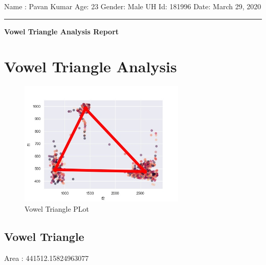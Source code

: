 \documentclass{article}%
\begin{document}
%
\normalsize%
\begin{minipage}{\textwidth}%
\flushleft%
Name : Pavan Kumar%
\newline%
Age: 23%
\newline%
Gender: Male%
\newline%
UH Id: 181996%
\newline%
Date: March 29, 2020%
\linebreak%
\noindent\rule{\textwidth}{1pt}%
\newline%
\linebreak%
\begin{minipage}{\textwidth}%
\centering%
\begin{Large}%
\textbf{Vowel Triangle Analysis Report}%
\end{Large}%
\end{minipage}%
\end{minipage}%
\section{Vowel Triangle Analysis}%
\label{sec:VowelTriangleAnalysis}%


\begin{figure}[h!]%
\centering%
\includegraphics[width=300px]{vowel_triangle.jpg}%
\caption{Vowel Triangle PLot}%
\end{figure}

%
\subsection{Vowel Triangle}%
\label{subsec:VowelTriangle}%
Area : 441512.15824963077

%
\pagebreak[4]

%
\end{document}
